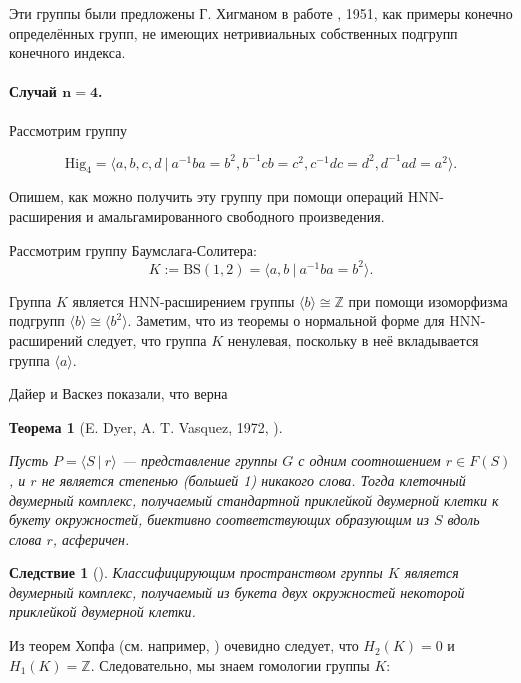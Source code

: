 \documentclass[14pt, dvipsnames, twoside]{extarticle}
\newtheorem{theorem}{Теорема}
\newtheorem{corollary}{Следствие}[theorem]
\theoremstyle{definition}
\theoremstyle{remark}
\begin{document}
Эти группы были предложены Г. Хигманом в работе \cite{Higman}, 1951, как примеры конечно определённых групп, не имеющих нетривиальных собственных подгрупп конечного индекса.

\paragraph{Случай $\bm{n = 4}$.} Рассмотрим группу

$$\mathrm{Hig}_4=\langle a, b, c, d\ |\ a^{-1}ba=b^2, b^{-1}cb=c^2, c^{-1}dc=d^2, d^{-1}ad=a^2 \rangle.$$ 

Опишем, как можно получить эту группу при помощи операций HNN-расширения и амальгамированного свободного произведения.

Рассмотрим группу Баумслага-Солитера: $$K := \mathrm{BS}(1,2)=\langle a, b\ |\ a^{-1}ba=b^2 \rangle.$$

Группа $K$ является HNN-расширением группы $\langle b \rangle\cong\mathbb{Z}$ при помощи изоморфизма подгрупп $\langle b \rangle \cong \langle b^2 \rangle$. Заметим, что из теоремы о нормальной форме для HNN-расширений \cite{Serre} следует, что группа $K$ ненулевая, поскольку в неё вкладывается группа $\langle a \rangle$. 


Дайер и Васкез показали, что верна

\begin{theorem}[E. Dyer, A. T. Vasquez, 1972, \cite{Vasquez}]\label{Vasquez}

Пусть $P=\langle S\ |\ r \rangle$ --- представление группы $G$ с одним соотношением $r\in F(S)$, и $r$ не является степенью (большей 1) никакого слова. Тогда клеточный двумерный комплекс, получаемый стандартной приклейкой двумерной клетки к букету окружностей, биективно соответствующих образующим из $S$ вдоль слова $r$, асферичен.

\end{theorem}



\begin{corollary}[\cite{BDH}]
Классифицирующим пространством группы $K$ является двумерный комплекс, получаемый из букета двух окружностей некоторой приклейкой двумерной клетки. 
\end{corollary}

Из теорем Хопфа (см. например, \cite{Brown}) очевидно следует, что $H_2(K)=0$ и $H_1(K)=\mathbb{Z}$. Следовательно, мы знаем гомологии группы $K$:
\end{document}
